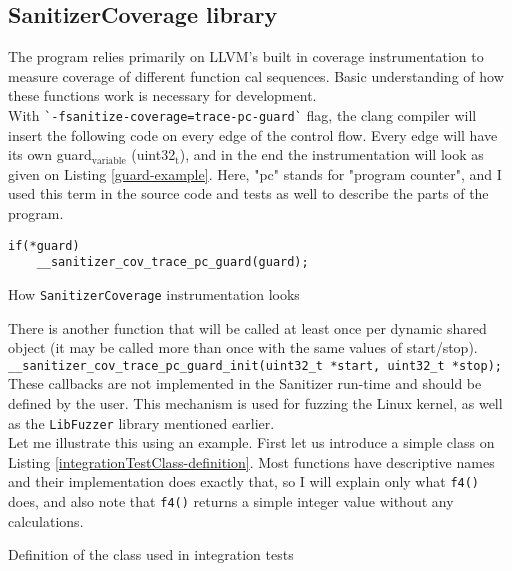 \documentclass{elteikthesis}[2018/06/06]
\newcommand*{\code}{\lstinline[keywordstyle=\color{violet}, basicstyle=\color{violet}]}
\begin{document}
\subsection{SanitizerCoverage library}
\label{sec-3-1-1}
The program relies primarily on LLVM's built in coverage instrumentation to measure coverage of different function cal sequences. Basic understanding of how these functions work is necessary for development. \\

With \code{`-fsanitize-coverage=trace-pc-guard`} flag, the clang compiler will insert the following code on every edge of the control flow. Every edge will have its own guard$_{\text{variable}}$ (uint32$_{\text{t}}$), and in the end the instrumentation will look as given on Listing \ref{guard-example}. Here, "pc" stands for "program counter", and I used this term in the source code and tests as well to describe the parts of the program. \\

\begin{listing}[H]
\begin{verbatim}
if(*guard)
    __sanitizer_cov_trace_pc_guard(guard);
\end{verbatim}
\caption{\label{guard-example}How \code{SanitizerCoverage} instrumentation looks}
\end{listing}

There is another function that will be called at least once per dynamic shared object (it may be called more than once with the same values of start/stop). \\

\code{__sanitizer_cov_trace_pc_guard_init(uint32_t *start, uint32_t *stop);} \\

These callbacks are not implemented in the Sanitizer run-time and should be defined by the user. This mechanism is used for fuzzing the Linux kernel, as well as the \code{LibFuzzer} library mentioned earlier. \\

Let me illustrate this using an example. First let us introduce a simple class on Listing \ref{integrationTestClass-definition}. Most functions have descriptive names and their implementation does exactly that, so I will explain only what \code{f4()} does, and also note that \code{f4()} returns a simple integer value without any calculations. \\

\begin{listing}
\caption{\label{integrationTestClass-definition}Definition of the class used in integration tests}
\inputminted[firstline=3,lastline=16]{c++}{test/integrationTestClass.h} \\
\end{listing}
\end{document}
